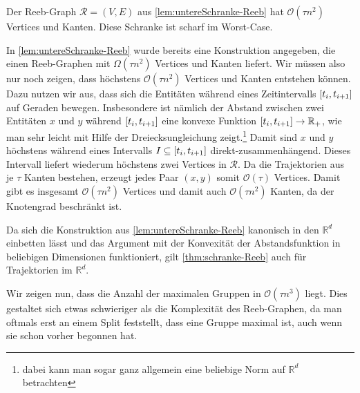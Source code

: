 \begin{satz}[name={\cite[Thm.~2]{buchin2015}},label=thm:schranke-Reeb]
	Der Reeb-Graph $\mathcal{R}=(V,E)$ aus \cref{lem:untereSchranke-Reeb} hat $\mathcal{O}(\tau n^2)$ Vertices und Kanten.
	Diese Schranke ist scharf im Worst-Case.
\end{satz}
\begin{beweis}
	In \cref{lem:untereSchranke-Reeb} wurde bereits eine Konstruktion angegeben, die einen Reeb-Graphen mit $\Omega(\tau n^2)$ Vertices und Kanten liefert.
	Wir müssen also nur noch zeigen, dass höchstens $\mathcal{O}(\tau n^2)$ Vertices und Kanten entstehen können.
	Dazu nutzen wir aus, dass sich die Entitäten während eines Zeitintervalls $\benbrace*{t_i,t_{i+1}}$ auf Geraden bewegen.
	Insbesondere ist nämlich der Abstand zwischen zwei Entitäten $x$ und $y$ während $\benbrace*{t_i,t_{i+1}}$ eine konvexe Funktion $\benbrace*{t_i,t_{i+1}} \to \mathbb{R}_+$, wie man sehr leicht mit Hilfe der Dreiecksungleichung zeigt.\footnote{dabei kann man sogar ganz allgemein eine beliebige Norm auf $\mathbb{R}^d$ betrachten}
	Damit sind $x$ und $y$ höchstens während eines Intervalls $I \subseteq \benbrace*{t_i,t_{i+1}}$ direkt-zusammenhängend.
	Dieses Intervall liefert wiederum höchstens zwei Vertices in $\mathcal{R}$.
	Da die Trajektorien aus je $\tau$ Kanten bestehen, erzeugt jedes Paar $(x,y)$ somit $\mathcal{O}(\tau)$ Vertices.
	Damit gibt es insgesamt $\mathcal{O}(\tau n^2)$ Vertices und damit auch $\mathcal{O}(\tau n^2)$ Kanten, da der Knotengrad beschränkt ist.
\end{beweis}

Da sich die Konstruktion aus \cref{lem:untereSchranke-Reeb} kanonisch in den $\mathbb{R}^d$ einbetten lässt und das Argument mit der Konvexität der Abstandsfunktion in beliebigen Dimensionen funktioniert, gilt \cref{thm:schranke-Reeb} auch für Trajektorien im $\mathbb{R}^d$.

Wir zeigen nun, dass die Anzahl der maximalen Gruppen in $\mathcal{O}(\tau n^3)$ liegt.
Dies gestaltet sich etwas schwieriger als die Komplexität des Reeb-Graphen, da man oftmals erst an einem Split feststellt, dass eine Gruppe maximal ist, auch wenn sie schon vorher begonnen hat.

